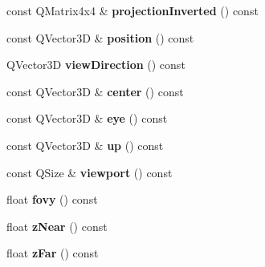 \begin{DoxyCompactItemize}
\item 
\hypertarget{class_camera_a6108163876720d7e856ac91c6835cde9}{}const Q\+Matrix4x4 \& {\bfseries projection\+Inverted} () const \label{class_camera_a6108163876720d7e856ac91c6835cde9}

\item 
\hypertarget{class_camera_aa03eb8b412fd5c6a496072503c78ee95}{}const Q\+Vector3\+D \& {\bfseries position} () const \label{class_camera_aa03eb8b412fd5c6a496072503c78ee95}

\item 
\hypertarget{class_camera_a3b5d47728aad185b6471e9d641e5716e}{}Q\+Vector3\+D {\bfseries view\+Direction} () const \label{class_camera_a3b5d47728aad185b6471e9d641e5716e}

\item 
\hypertarget{class_camera_a3eabf004448f650a632365cfd3d6980b}{}const Q\+Vector3\+D \& {\bfseries center} () const \label{class_camera_a3eabf004448f650a632365cfd3d6980b}

\item 
\hypertarget{class_camera_a2558b66a8e6b053468bb1f5ffcc5841b}{}const Q\+Vector3\+D \& {\bfseries eye} () const \label{class_camera_a2558b66a8e6b053468bb1f5ffcc5841b}

\item 
\hypertarget{class_camera_a86a19bc4ac24604bb5c0b3f4b6dad193}{}const Q\+Vector3\+D \& {\bfseries up} () const \label{class_camera_a86a19bc4ac24604bb5c0b3f4b6dad193}

\item 
\hypertarget{class_camera_af74af0fabb70490072ebeb013582284a}{}const Q\+Size \& {\bfseries viewport} () const \label{class_camera_af74af0fabb70490072ebeb013582284a}

\item 
\hypertarget{class_camera_a74f8741128595da3efa466cb5e580601}{}float {\bfseries fovy} () const \label{class_camera_a74f8741128595da3efa466cb5e580601}

\item 
\hypertarget{class_camera_a898b996f8cc534948886387193bcbc52}{}float {\bfseries z\+Near} () const \label{class_camera_a898b996f8cc534948886387193bcbc52}

\item 
\hypertarget{class_camera_a14e0e8d92dfcd76624780288caa7de8e}{}float {\bfseries z\+Far} () const \label{class_camera_a14e0e8d92dfcd76624780288caa7de8e}

\end{DoxyCompactItemize}
